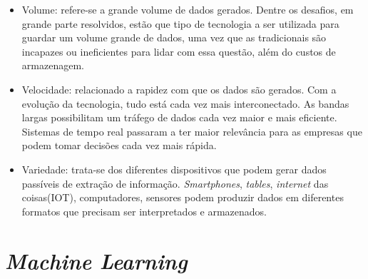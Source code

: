 \begin{itemize}
  \item Volume: refere-se a grande volume de dados gerados. Dentre os desafios, em grande parte resolvidos, estão que tipo de tecnologia a ser utilizada para guardar um volume grande de dados, uma vez que as tradicionais são incapazes ou ineficientes para lidar com essa questão, além do custos de armazenagem.
  \item Velocidade: relacionado a rapidez com que os dados são gerados. Com a evolução da tecnologia, tudo está cada vez mais interconectado. As bandas largas possibilitam um tráfego de dados cada vez maior e mais eficiente. Sistemas de tempo real passaram a ter maior relevância para as empresas que podem tomar decisões cada vez mais rápida.
  \item Variedade: trata-se dos diferentes dispositivos que podem gerar dados passíveis de extração de informação. \emph{Smartphones}, \emph{tables}, \emph{internet} das coisas(IOT), computadores, sensores podem produzir dados em diferentes formatos que precisam ser interpretados e armazenados.
\end{itemize}


\chapter{\emph{Machine Learning}}











